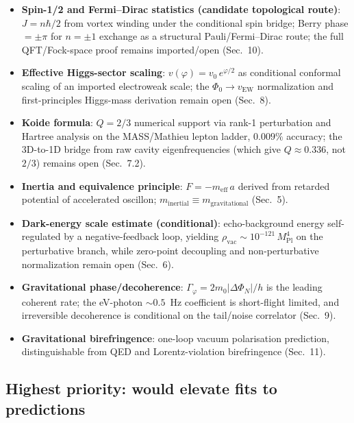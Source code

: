 \documentclass[11pt]{article}
\begin{document}
\begin{itemize}
  \item[$\triangleright$] \textbf{Spin-1/2 and
    Fermi--Dirac statistics (candidate topological route)}:
    $J = n\hbar/2$ from vortex winding under the
    conditional spin bridge; Berry phase $= \pm\pi$
    for $n = \pm 1$ exchange as a structural Pauli/Fermi--Dirac
    route; the full QFT/Fock-space proof remains imported/open
    (Sec.~10).
  \item[$\triangleright$] \textbf{Effective Higgs-sector scaling}:
    $v(\varphi) = v_0\,e^{\varphi/2}$ as conditional
    conformal scaling of an imported electroweak scale;
    the $\Phi_0\to v_{\mathrm{EW}}$ normalization and
    first-principles Higgs-mass derivation remain open
    (Sec.~8).
  \item[\checkmark] \textbf{Koide formula}:
    $Q = 2/3$ numerical support via rank-1
    perturbation and Hartree analysis on the MASS/Mathieu
    lepton ladder, $0.009\%$ accuracy; the 3D-to-1D
    bridge from raw cavity eigenfrequencies (which give
    $Q\approx 0.336$, not $2/3$) remains open
    (Sec.~7.2).
  \item[\checkmark] \textbf{Inertia and
    equivalence principle}: $F = -m_{\mathrm{eff}}
    \,a$ derived from retarded potential of
    accelerated oscillon;
    $m_{\mathrm{inertial}} \equiv
    m_{\mathrm{gravitational}}$ (Sec.~5).
  \item[$\circ$] \textbf{Dark-energy scale estimate
    (conditional)}:
    echo-background energy self-regulated by a negative-feedback
    loop, yielding $\rho_{\mathrm{vac}}
    \sim 10^{-121}\,M_{\mathrm{Pl}}^4$ on the perturbative
    branch, while zero-point decoupling and non-perturbative
    normalization remain open (Sec.~6).
  \item[$\circ$] \textbf{Gravitational
    phase/decoherence}: $\Gamma_{\varphi}
    = 2m_0|\Delta\Phi_N|/h$ is the leading coherent
    rate; the eV-photon $\sim 0.5$~Hz coefficient is
    short-flight limited, and irreversible decoherence
    is conditional on the tail/noise correlator
    (Sec.~9).
  \item[\checkmark] \textbf{Gravitational
    birefringence}: one-loop vacuum polarisation
    prediction, distinguishable from QED and
    Lorentz-violation birefringence (Sec.~11).
\end{itemize}

\subsection*{Highest priority: would elevate fits
to predictions}
\end{document}
